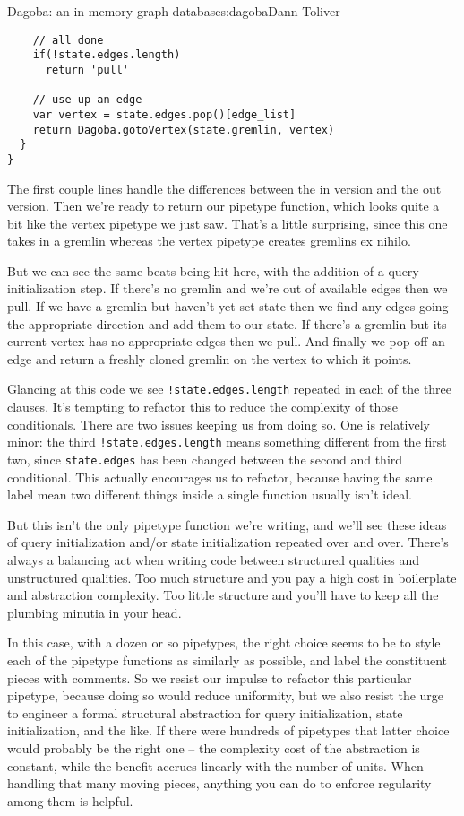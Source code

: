 \begin{aosachapter}{Dagoba: an in-memory graph database}{s:dagoba}{Dann Toliver}
\begin{verbatim}
    // all done
    if(!state.edges.length)                                       
      return 'pull'
    
    // use up an edge
    var vertex = state.edges.pop()[edge_list]                     
    return Dagoba.gotoVertex(state.gremlin, vertex)
  }
}
\end{verbatim}

The first couple lines handle the differences between the in version and
the out version. Then we're ready to return our pipetype function, which
looks quite a bit like the vertex pipetype we just saw. That's a little
surprising, since this one takes in a gremlin whereas the vertex
pipetype creates gremlins ex nihilo.

But we can see the same beats being hit here, with the addition of a
query initialization step. If there's no gremlin and we're out of
available edges then we pull. If we have a gremlin but haven't yet set
state then we find any edges going the appropriate direction and add
them to our state. If there's a gremlin but its current vertex has no
appropriate edges then we pull. And finally we pop off an edge and
return a freshly cloned gremlin on the vertex to which it points.

Glancing at this code we see \texttt{!state.edges.length} repeated in
each of the three clauses. It's tempting to refactor this to reduce the
complexity of those conditionals. There are two issues keeping us from
doing so. One is relatively minor: the third
\texttt{!state.edges.length} means something different from the first
two, since \texttt{state.edges} has been changed between the second and
third conditional. This actually encourages us to refactor, because
having the same label mean two different things inside a single function
usually isn't ideal.

But this isn't the only pipetype function we're writing, and we'll see
these ideas of query initialization and/or state initialization repeated
over and over. There's always a balancing act when writing code between
structured qualities and unstructured qualities. Too much structure and
you pay a high cost in boilerplate and abstraction complexity. Too
little structure and you'll have to keep all the plumbing minutia in
your head.

In this case, with a dozen or so pipetypes, the right choice seems to be
to style each of the pipetype functions as similarly as possible, and
label the constituent pieces with comments. So we resist our impulse to
refactor this particular pipetype, because doing so would reduce
uniformity, but we also resist the urge to engineer a formal structural
abstraction for query initialization, state initialization, and the
like. If there were hundreds of pipetypes that latter choice would
probably be the right one -- the complexity cost of the abstraction is
constant, while the benefit accrues linearly with the number of units.
When handling that many moving pieces, anything you can do to enforce
regularity among them is helpful.


\end{aosachapter}
